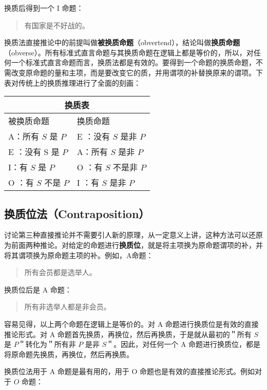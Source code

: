 换质后得到一个 I 命题：

\begin{quote}
有国家是不好战的。
\end{quote}

换质法直接推论中的前提叫做\textbf{被换质命题}（obvertend），结论叫做\textbf{换质命题}（obverse）。所有标准式直言命题与其换质命题在逻辑上都是等价的，所以，对任何一个标准式直言命题而言，换质法都是有效的。要得到一个命题的换质命题，不需改变原命题的量和主项，而是要改变它的质，并用谓项的补替换原来的谓项。下表对传统上的换质推理进行了全面的刻画：

\begin{center}
\begin{tabular}{|l|l|}
\hline
\multicolumn{2}{|c|}{换质表} \\
\hline
被换质命题 & 换质命题 \\
\hline
A：所有 $S$ 是 $P$ & E ：没有 $S$ 是非 $P$ \\
\hline
E ：没有 S 是 $P$ & A：所有 $S$ 是非 $P$ \\
\hline
I：有 $S$ 是 $P$ & O ：有 $S$ 不是非 $P$ \\
\hline
O ：有 $S$ 不是 $P$ & I ：有 $S$ 是非 $P$ \\
\hline
\end{tabular}
\end{center}

\subsection{换质位法（Contraposition）}
讨论第三种直接推论并不需要引人新的原理，从一定意义上讲，这种方法可以还原为前面两种推论。对给定的命题进行\textbf{换质位}，就是将主项换为原命题谓项的补，并将其谓项换为原命题主项的补。例如，A命题：

\begin{quote}
所有会员都是选举人。
\end{quote}

换质位后是 A 命题：

\begin{quote}
所有非选举人都是非会员。
\end{quote}

容易见得，以上两个命题在逻辑上是等价的。对 A 命题进行换质位是有效的直接推论形式。对 A 命题首先换质，再换位，然后再换质，于是就从最初的＂所有 $S$ 是 $P$＂转化为＂所有非 $P$ 是非 $S$＂。因此，对任何一个 A 命题进行换质位，都是将原命题先换质，再换位，然后再换质。

换质位法用于 A 命题是最有用的，用于 O 命题也是有效的直接推论形式。例如对于 $O$ 命题：

